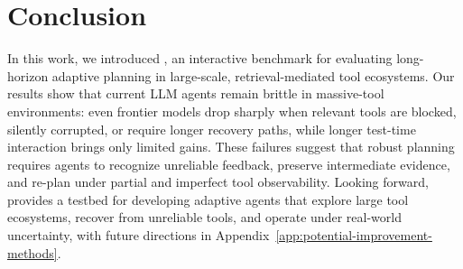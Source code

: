 \section{Conclusion}






In this work, we introduced \BENCH{}, an interactive benchmark for evaluating long-horizon adaptive planning in large-scale, retrieval-mediated tool ecosystems.
Our results show that current LLM agents remain brittle in massive-tool environments: even frontier models drop sharply when relevant tools are blocked, silently corrupted, or require longer recovery paths, while longer test-time interaction brings only limited gains.
These failures suggest that robust planning requires agents to recognize unreliable feedback, preserve intermediate evidence, and re-plan under partial and imperfect tool observability.
Looking forward, \bench{} provides a testbed for developing adaptive agents that explore large tool ecosystems, recover from unreliable tools, and operate under real-world uncertainty, with future directions in Appendix~\ref{app:potential-improvement-methods}.